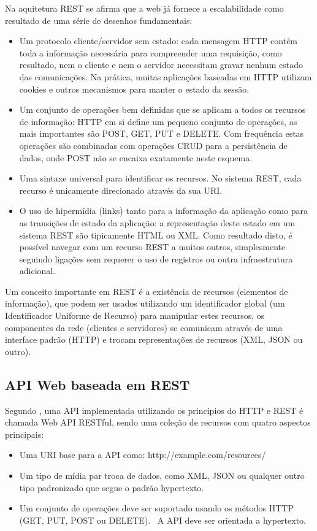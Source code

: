Na aquitetura REST se afirma que a web já fornece a escalabilidade como resultado de uma série de desenhos fundamentais:

\begin{itemize}
	\item Um protocolo cliente/servidor sem estado: cada mensagem HTTP contém toda a informação necessária para compreender uma requisição, como resultado, nem o cliente e nem o servidor necessitam gravar nenhum estado das comunicações. Na prática, muitas aplicações baseadas em HTTP utilizam cookies e outros mecanismos para manter o estado da sessão.
	\item	Um conjunto de operações bem definidas que se aplicam a todos os recursos de informação: HTTP em si define um pequeno conjunto de operações, as mais importantes são POST, GET, PUT e DELETE. Com frequência estas operações são combinadas com operações CRUD para a persistência de dados, onde POST não se encaixa exatamente neste esquema.
	\item	Uma sintaxe universal para identificar os recursos. No sistema REST, cada recurso é unicamente direcionado através da sua URI.
	\item	O uso de hipermídia (links) tanto para a informação da aplicação como para as transições de estado da aplicação: a representação deste estado em um sistema REST são tipicamente HTML ou XML. Como resultado disto, é possível navegar com um recurso REST a muitos outros, simplesmente seguindo ligações sem requerer o uso de registros ou outra infraestrutura adicional.
\end{itemize}

Um conceito importante em REST é a existência de recursos (elementos de informação), que podem ser usados utilizando um identificador global (um Identificador Uniforme de Recurso) para manipular estes recursos, os componentes da rede (clientes e servidores) se comunicam através de uma interface padrão (HTTP) e trocam representações de recursos (XML, JSON ou outro).

\subsection {API Web baseada em REST}

Segundo \textcite{w3c_ws:2004}, uma API implementada utilizando os princípios do HTTP e REST é chamada Web API RESTful, sendo uma coleção de recursos com quatro aspectos principais:

\begin{itemize}
	\item Uma URI base para a API como: http://example.com/resources/
	\item Um tipo de mídia par troca de dados, como XML, JSON ou qualquer outro tipo padronizado que segue o padrão hypertexto.
	\item Um conjunto de operações deve ser suportado usando os métodos HTTP (GET, PUT, POST ou DELETE).
	\ A API deve ser orientada a hypertexto.
\end{itemize}

